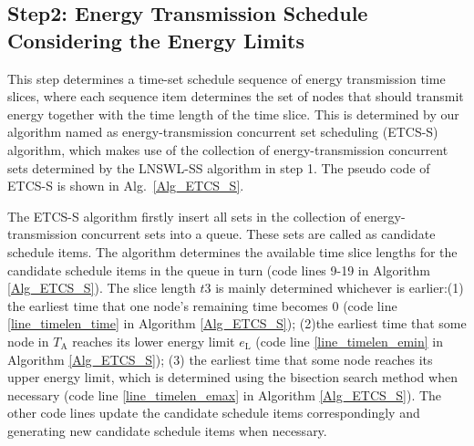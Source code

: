 \documentclass[journal,10pt]{IEEEtran}
\begin{document}
\subsection{Step2: Energy Transmission Schedule Considering the Energy Limits}

This step determines a time-set schedule sequence of energy transmission time slices, where each sequence item determines the set of nodes that should transmit energy together with the time length of the time slice. This is determined by our algorithm named as energy-transmission concurrent set scheduling (ETCS-S) algorithm, which makes use of the collection of energy-transmission concurrent sets determined by the LNSWL-SS algorithm in step 1. The pseudo code of ETCS-S is shown in Alg.~\ref{Alg_ETCS_S}.

The ETCS-S algorithm firstly insert all sets in the collection of energy-transmission concurrent sets into a queue. These sets are called as candidate schedule items. The algorithm determines the available time slice lengths for the candidate schedule items in the queue in turn (code lines 9-19 in Algorithm \ref{Alg_ETCS_S}). The slice length $t3$ is mainly determined whichever is earlier:(1) the earliest time that one node's remaining time becomes 0 (code line \ref{line_timelen_time} in Algorithm \ref{Alg_ETCS_S}); (2)the earliest time that some node in $T_\text{A}$ reaches its lower energy limit $e_\text{L}$ (code line \ref{line_timelen_emin} in Algorithm \ref{Alg_ETCS_S}); (3) the earliest time that some node reaches its upper energy limit, which is determined using the bisection search method when necessary (code line \ref{line_timelen_emax} in Algorithm \ref{Alg_ETCS_S}). The other code lines update the candidate schedule items correspondingly and generating new candidate schedule items when necessary.
\end{document}
